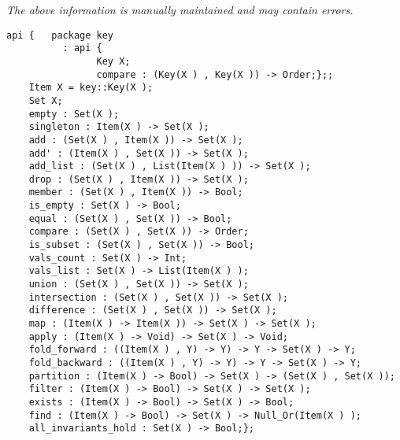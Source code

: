 \label{api:Setx}

{\tiny \it The above information is manually maintained and may contain errors.}
\begin{verbatim}
api {   package key
          : api {
                Key X;
                compare : (Key(X ) , Key(X )) -> Order;};;
    Item X = key::Key(X );
    Set X;
    empty : Set(X );
    singleton : Item(X ) -> Set(X );
    add : (Set(X ) , Item(X )) -> Set(X );
    add' : (Item(X ) , Set(X )) -> Set(X );
    add_list : (Set(X ) , List(Item(X ) )) -> Set(X );
    drop : (Set(X ) , Item(X )) -> Set(X );
    member : (Set(X ) , Item(X )) -> Bool;
    is_empty : Set(X ) -> Bool;
    equal : (Set(X ) , Set(X )) -> Bool;
    compare : (Set(X ) , Set(X )) -> Order;
    is_subset : (Set(X ) , Set(X )) -> Bool;
    vals_count : Set(X ) -> Int;
    vals_list : Set(X ) -> List(Item(X ) );
    union : (Set(X ) , Set(X )) -> Set(X );
    intersection : (Set(X ) , Set(X )) -> Set(X );
    difference : (Set(X ) , Set(X )) -> Set(X );
    map : (Item(X ) -> Item(X )) -> Set(X ) -> Set(X );
    apply : (Item(X ) -> Void) -> Set(X ) -> Void;
    fold_forward : ((Item(X ) , Y) -> Y) -> Y -> Set(X ) -> Y;
    fold_backward : ((Item(X ) , Y) -> Y) -> Y -> Set(X ) -> Y;
    partition : (Item(X ) -> Bool) -> Set(X ) -> (Set(X ) , Set(X ));
    filter : (Item(X ) -> Bool) -> Set(X ) -> Set(X );
    exists : (Item(X ) -> Bool) -> Set(X ) -> Bool;
    find : (Item(X ) -> Bool) -> Set(X ) -> Null_Or(Item(X ) );
    all_invariants_hold : Set(X ) -> Bool;};
\end{verbatim}
